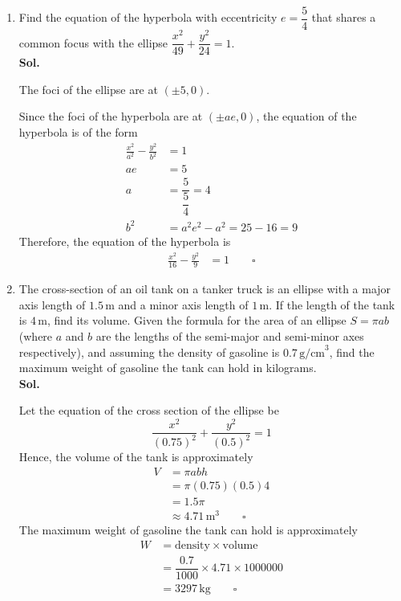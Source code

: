 \documentclass{report}
\newcommand{\sol}{\vspace{1em}\\\textbf{Sol.}}
\newcommand{\eos}{ \qquad \square}
\begin{document}
\begin{enumerate}
    \item Find the equation of the hyperbola with eccentricity $e=\dfrac{5}{4}$ that
          shares a common focus with the ellipse $\dfrac{x^2}{49} + \dfrac{y^2}{24} = 1$.
          \sol{}

          The foci of the ellipse are at $(\pm 5, 0)$.

          Since the foci of the hyperbola are at $(\pm ae, 0)$, the equation of the
          hyperbola is of the form
          \begin{align*}
              \frac{x^2}{a^2} - \frac{y^2}{b^2} & = 1                            \\
              ae                                & = 5                            \\
              a                                 & = \dfrac{5}{\dfrac{5}{4}}  = 4 \\
              b^2                               & = a^2e^2 - a^2 = 25 - 16 = 9
          \end{align*}
          Therefore, the equation of the hyperbola is
          \begin{align*}
              \frac{x^2}{16} - \frac{y^2}{9} & = 1 \eos
          \end{align*}

    \item The cross-section of an oil tank on a tanker truck is an ellipse with a major
          axis length of $1.5 \, \text{m}$ and a minor axis length of $1 \, \text{m}$. If
          the length of the tank is $4 \, \text{m}$, find its volume. Given the formula
          for the area of an ellipse $S=\pi ab$ (where $a$ and $b$ are the lengths of the
          semi-major and semi-minor axes respectively), and assuming the density of
          gasoline is $0.7 \, \text{g/cm}^3$, find the maximum weight of gasoline the
          tank can hold in kilograms. \sol{}

          Let the equation of the cross section of the ellipse be
          \begin{equation*}
              \frac{x^2}{\left(0.75\right)^2} + \frac{y^2}{\left(0.5\right)^2} = 1
          \end{equation*}
          Hence, the volume of the tank is approximately
          \begin{align*}
              V & = \pi abh                                \\
                & = \pi \left(0.75\right)\left(0.5\right)4 \\
                & = 1.5\pi                                 \\
                & \approx 4.71 \, \text{m}^3 \eos
          \end{align*}
          The maximum weight of gasoline the tank can hold is approximately
          \begin{align*}
              W & = \text{density} \times \text{volume}          \\
                & = \dfrac{0.7}{1000} \times 4.71 \times 1000000 \\
                & = 3297 \, \text{kg} \eos
          \end{align*}


\end{enumerate}
\end{document}
